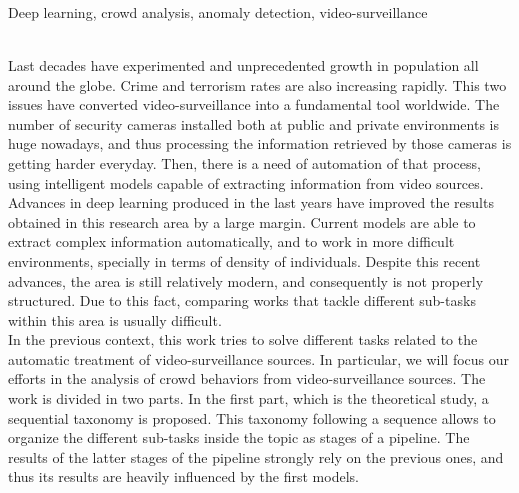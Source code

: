\thispagestyle{empty}

\begin{center}
  {\large\bfseries \ProjectTitleEng}\\
\end{center}

\begin{center}
  \AuthorName\\
  \vspace{0.7cm}
  \\
  Deep learning, crowd analysis, anomaly detection, video-surveillance\\
  \vspace{0.7cm}
  \\
\end{center}

Last decades have experimented and unprecedented growth in population
all around the globe. Crime and terrorism rates are also increasing
rapidly. This two issues have converted video-surveillance into a
fundamental tool worldwide. The number of security cameras installed
both at public and private environments is huge nowadays, and thus
processing the information retrieved by those cameras is getting
harder everyday. Then, there is a need of automation of that process,
using intelligent models capable of extracting information from video
sources.\\

Advances in deep learning produced in the last years have improved the
results obtained in this research area by a large margin. Current
models are able to extract complex information automatically, and to
work in more difficult environments, specially in terms of density of
individuals. Despite this recent advances, the area is still
relatively modern, and consequently is not properly structured. Due to
this fact, comparing works that tackle different sub-tasks within this
area is usually difficult.\\

In the previous context, this work tries to solve different tasks
related to the automatic treatment of video-surveillance sources. In
particular, we will focus our efforts in the analysis of crowd
behaviors from video-surveillance sources. The work is divided in two
parts. In the first part, which is the theoretical study, a sequential
taxonomy is proposed. This taxonomy following a sequence allows to
organize the different sub-tasks inside the topic as stages of a
pipeline. The results of the latter stages of the pipeline strongly
rely on the previous ones, and thus its results are heavily influenced
by the first models.\\

